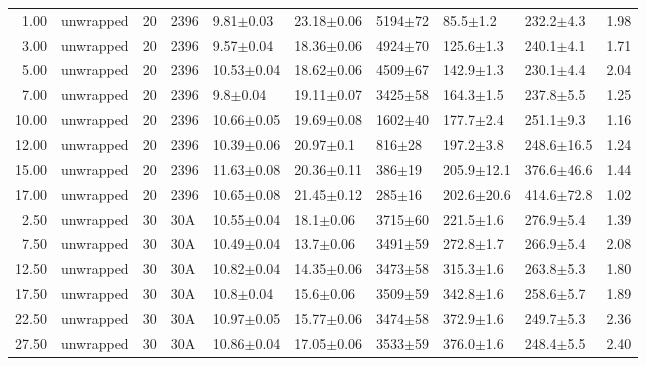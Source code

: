 \begin{table}
\begin{tabular}{rlrllllllr}
      1.00 &     unwrapped &      20 &    2396 &        9.81$\pm$0.03 &   23.18$\pm$0.06 &  5194$\pm$72 &    85.5$\pm$1.2 &   232.2$\pm$4.3 &        1.98 \\
      3.00 &     unwrapped &      20 &    2396 &        9.57$\pm$0.04 &   18.36$\pm$0.06 &  4924$\pm$70 &   125.6$\pm$1.3 &   240.1$\pm$4.1 &        1.71 \\
      5.00 &     unwrapped &      20 &    2396 &       10.53$\pm$0.04 &   18.62$\pm$0.06 &  4509$\pm$67 &   142.9$\pm$1.3 &   230.1$\pm$4.4 &        2.04 \\
      7.00 &     unwrapped &      20 &    2396 &         9.8$\pm$0.04 &   19.11$\pm$0.07 &  3425$\pm$58 &   164.3$\pm$1.5 &   237.8$\pm$5.5 &        1.25 \\
     10.00 &     unwrapped &      20 &    2396 &       10.66$\pm$0.05 &   19.69$\pm$0.08 &  1602$\pm$40 &   177.7$\pm$2.4 &   251.1$\pm$9.3 &        1.16 \\
     12.00 &     unwrapped &      20 &    2396 &       10.39$\pm$0.06 &    20.97$\pm$0.1 &   816$\pm$28 &   197.2$\pm$3.8 &  248.6$\pm$16.5 &        1.24 \\
     15.00 &     unwrapped &      20 &    2396 &       11.63$\pm$0.08 &   20.36$\pm$0.11 &   386$\pm$19 &  205.9$\pm$12.1 &  376.6$\pm$46.6 &        1.44 \\
     17.00 &     unwrapped &      20 &    2396 &       10.65$\pm$0.08 &   21.45$\pm$0.12 &   285$\pm$16 &  202.6$\pm$20.6 &  414.6$\pm$72.8 &        1.02 \\
      2.50 &     unwrapped &      30 &     30A &       10.55$\pm$0.04 &    18.1$\pm$0.06 &  3715$\pm$60 &   221.5$\pm$1.6 &   276.9$\pm$5.4 &        1.39 \\
      7.50 &     unwrapped &      30 &     30A &       10.49$\pm$0.04 &    13.7$\pm$0.06 &  3491$\pm$59 &   272.8$\pm$1.7 &   266.9$\pm$5.4 &        2.08 \\
     12.50 &     unwrapped &      30 &     30A &       10.82$\pm$0.04 &   14.35$\pm$0.06 &  3473$\pm$58 &   315.3$\pm$1.6 &   263.8$\pm$5.3 &        1.80 \\
     17.50 &     unwrapped &      30 &     30A &        10.8$\pm$0.04 &    15.6$\pm$0.06 &  3509$\pm$59 &   342.8$\pm$1.6 &   258.6$\pm$5.7 &        1.89 \\
     22.50 &     unwrapped &      30 &     30A &       10.97$\pm$0.05 &   15.77$\pm$0.06 &  3474$\pm$58 &   372.9$\pm$1.6 &   249.7$\pm$5.3 &        2.36 \\
     27.50 &     unwrapped &      30 &     30A &       10.86$\pm$0.04 &   17.05$\pm$0.06 &  3533$\pm$59 &   376.0$\pm$1.6 &   248.4$\pm$5.5 &        2.40 \\

\end{tabular}
\end{table}
